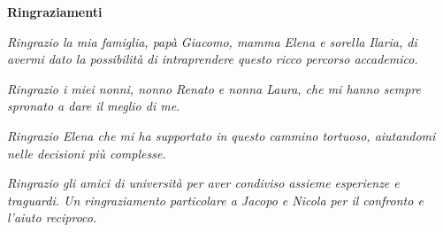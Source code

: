 \thispagestyle{empty}

\begin{center}
  {\bf \Huge Ringraziamenti}
\end{center}

\vspace{4cm}


\emph{
    Ringrazio la mia famiglia, papà Giacomo, mamma Elena e sorella Ilaria, di avermi dato la possibilità di intraprendere questo ricco percorso accademico.
}
\vspace{1cm}

\emph{
    Ringrazio i miei nonni, nonno Renato e nonna Laura, che mi hanno sempre spronato a dare il meglio di me.   
}
\vspace{1cm}


\emph{
    Ringrazio Elena che mi ha supportato in questo cammino tortuoso, aiutandomi nelle decisioni più complesse.
}
\vspace{1cm}

\emph{
    Ringrazio gli amici di università per aver condiviso assieme esperienze e traguardi. Un ringraziamento particolare a Jacopo e Nicola per il confronto e l'aiuto reciproco.
}